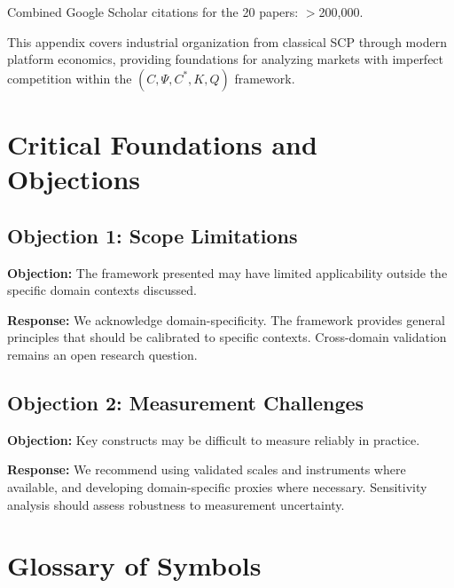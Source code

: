 Combined Google Scholar citations for the 20 papers: $>$200,000.

This appendix covers industrial organization from classical SCP through 
modern platform economics, providing foundations for analyzing markets 
with imperfect competition within the $(C, \Psi, C^*, K, Q)$ framework.




\section{Critical Foundations and Objections}
\label{sec:ioo-foundations}

\subsection{Objection 1: Scope Limitations}

\textbf{Objection:} The framework presented may have limited applicability
outside the specific domain contexts discussed.

\textbf{Response:} We acknowledge domain-specificity. The framework provides
general principles that should be calibrated to specific contexts. Cross-domain
validation remains an open research question.

\subsection{Objection 2: Measurement Challenges}

\textbf{Objection:} Key constructs may be difficult to measure reliably in
practice.

\textbf{Response:} We recommend using validated scales and instruments where
available, and developing domain-specific proxies where necessary. Sensitivity
analysis should assess robustness to measurement uncertainty.



\section{Glossary of Symbols}
\label{sec:ioo-glossary}

